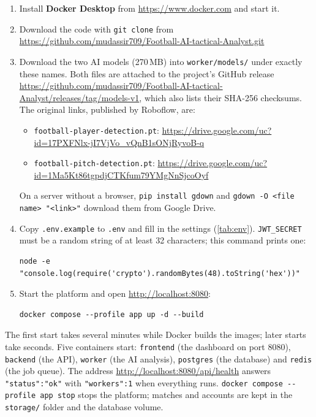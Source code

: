\begin{enumerate}
	\item Install \textbf{Docker Desktop} from \url{https://www.docker.com} and start it.
	\item Download the code with \texttt{git clone} from \url{https://github.com/mudassir709/Football-AI-tactical-Analyst.git}
	\item Download the two AI models (270\,MB) into \texttt{worker/\allowbreak{}models/} under exactly these names. Both files are attached to the project's GitHub release \url{https://github.com/mudassir709/Football-AI-tactical-Analyst/releases/tag/models-v1}, which also lists their SHA-256 checksums. The original links, published by Roboflow, are:
	\begin{itemize}
		\item \texttt{football-player-detection.\allowbreak{}pt}: \url{https://drive.google.com/uc?id=17PXFNlx-jI7VjVo_vQnB1sONjRyvoB-q}
		\item \texttt{football-pitch-detection.\allowbreak{}pt}: \url{https://drive.google.com/uc?id=1Ma5Kt86tgpdjCTKfum79YMgNnSjcoOyf}
	\end{itemize}
	On a server without a browser, \texttt{pip install gdown} and \texttt{gdown -O <file name> "<link>"} download them from Google Drive.
	\item Copy \texttt{.env.example} to \texttt{.env} and fill in the settings (\autoref{tab:env}). \texttt{JWT\_SECRET} must be a random string of at least 32 characters; this command prints one:
\begin{lstlisting}[style=plain]
node -e "console.log(require('crypto').randomBytes(48).toString('hex'))"
\end{lstlisting}
	\item Start the platform and open \url{http://localhost:8080}:
\begin{lstlisting}[style=plain]
docker compose --profile app up -d --build
\end{lstlisting}
\end{enumerate}

The first start takes several minutes while Docker builds the images; later starts take seconds. Five containers start: \texttt{frontend} (the dashboard on port 8080), \texttt{backend} (the API), \texttt{worker} (the AI analysis), \texttt{postgres} (the database) and \texttt{redis} (the job queue). The address \url{http://localhost:8080/api/health} answers \texttt{"status":"ok"} with \texttt{"workers":1} when everything runs. \texttt{docker compose -{}-profile app stop} stops the platform; matches and accounts are kept in the \texttt{storage/} folder and the database volume.

